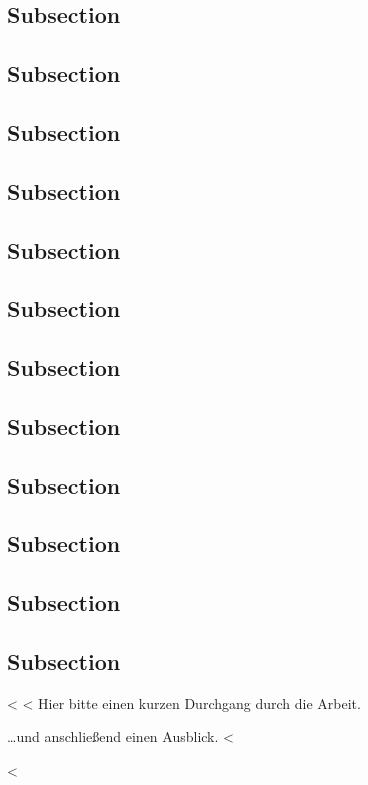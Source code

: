 {{{{\subsection{Subsection}
\subsection{Subsection}
\subsection{Subsection}
\subsection{Subsection}
\subsection{Subsection}
\subsection{Subsection}
\subsection{Subsection}
\subsection{Subsection}
\subsection{Subsection}
\subsection{Subsection}
\subsection{Subsection}
\subsection{Subsection}

<%
<%
\label{sec:outlook}
Hier bitte einen kurzen Durchgang durch die Arbeit.

\lipsum[1-2]

\ldots und anschließend einen Ausblick.
<%

<%
}}}}
